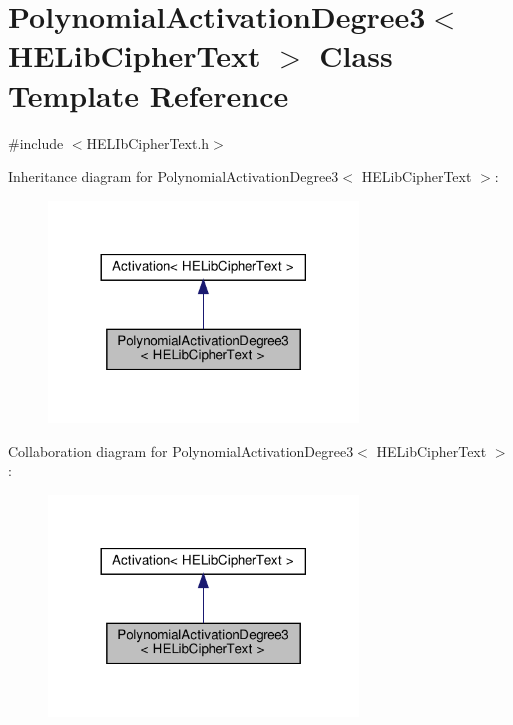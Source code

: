 \hypertarget{classPolynomialActivationDegree3_3_01HELibCipherText_01_4}{}\section{Polynomial\+Activation\+Degree3$<$ H\+E\+Lib\+Cipher\+Text $>$ Class Template Reference}
\label{classPolynomialActivationDegree3_3_01HELibCipherText_01_4}


{\ttfamily \#include $<$H\+E\+L\+Ib\+Cipher\+Text.\+h$>$}



Inheritance diagram for Polynomial\+Activation\+Degree3$<$ H\+E\+Lib\+Cipher\+Text $>$\+:
\nopagebreak
\begin{figure}[H]
\begin{center}
\leavevmode
\includegraphics[width=233pt]{classPolynomialActivationDegree3_3_01HELibCipherText_01_4__inherit__graph}
\end{center}
\end{figure}


Collaboration diagram for Polynomial\+Activation\+Degree3$<$ H\+E\+Lib\+Cipher\+Text $>$\+:
\nopagebreak
\begin{figure}[H]
\begin{center}
\leavevmode
\includegraphics[width=233pt]{classPolynomialActivationDegree3_3_01HELibCipherText_01_4__coll__graph}
\end{center}
\end{figure}
